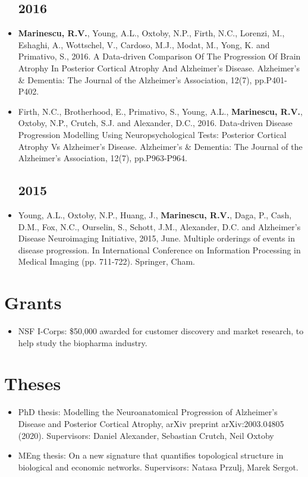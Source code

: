 \documentclass[a4paper,10pt]{article} %
\begin{document}
\begin{itemize}
\subsection*{2016}
\item[\poster] \textbf{Marinescu, R.V.}, Young, A.L., Oxtoby, N.P., Firth, N.C., Lorenzi, M., Eshaghi, A., Wottschel, V., Cardoso, M.J., Modat, M., Yong, K. and Primativo, S., 2016. A Data-driven Comparison Of The Progression Of Brain Atrophy In Posterior Cortical Atrophy And Alzheimer's Disease. Alzheimer's \& Dementia: The Journal of the Alzheimer's Association, 12(7), pp.P401-P402.
\item[\poster] Firth, N.C., Brotherhood, E., Primativo, S., Young, A.L., \textbf{Marinescu, R.V.}, Oxtoby, N.P., Crutch, S.J. and Alexander, D.C., 2016. Data-driven Disease Progression Modelling Using Neuropsychological Tests: Posterior Cortical Atrophy Vs Alzheimer's Disease. Alzheimer's \& Dementia: The Journal of the Alzheimer's Association, 12(7), pp.P963-P964.

\subsection*{2015}
\item[\poster] Young, A.L., Oxtoby, N.P., Huang, J., \textbf{Marinescu, R.V.}, Daga, P., Cash, D.M., Fox, N.C., Ourselin, S., Schott, J.M., Alexander, D.C. and Alzheimer's Disease Neuroimaging Initiative, 2015, June. Multiple orderings of events in disease progression. In International Conference on Information Processing in Medical Imaging (pp. 711-722). Springer, Cham.




\end{itemize}

\section*{Grants}

\begin{itemize}
 \item NSF I-Corps: \$50,000 awarded for customer discovery and market research, to help study the biopharma industry.
\end{itemize} 

\section*{Theses}
\begin{itemize}
 \item PhD thesis: Modelling the Neuroanatomical Progression of Alzheimer's Disease and Posterior Cortical Atrophy, arXiv preprint arXiv:2003.04805 (2020). Supervisors: Daniel Alexander, Sebastian Crutch, Neil Oxtoby
  \item MEng thesis: On a new signature that quantifies topological structure in biological and economic networks. Supervisors: Natasa Przulj, Marek Sergot.
\end{itemize}
\end{document}
